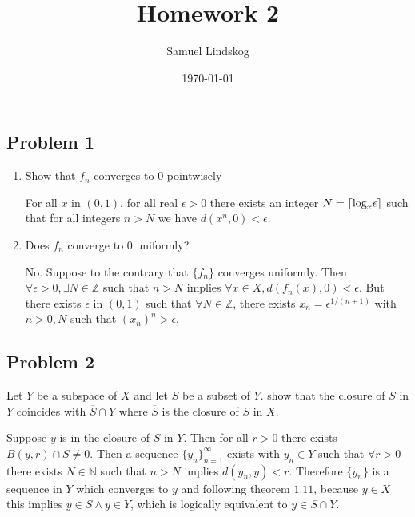 \documentclass{article}
\title{Homework 2}
\author{Samuel Lindskog}
\date\today
\DeclarePairedDelimiter{\ceil}{\lceil}{\rceil}
\begin{document}
\maketitle %

\subsection*{Problem 1}
\begin{enumerate}
	\item Show that \(f_n\) converges to \(0\) pointwisely
		\begin{IEEEproof}
			For all \(x\) in \((0,1)\), for all real \(\epsilon>0\) there exists an integer \(N=\ceil{\text{log}_x\epsilon}\) such that for all integers \(n>N\) we have \(d(x^n,0)<\epsilon\).
		\end{IEEEproof}
	\item Does \(f_n\) converge to \(0\) uniformly?
		\begin{IEEEproof}
			No. Suppose to the contrary that \(\{f_n\}\) converges uniformly. Then \(\forall\epsilon>0,\exists N\in\mathbb{Z}\) such that \(n>N\) implies \(\forall x\in X,d(f_n(x),0)<\epsilon\). But there exists \(\epsilon\) in \((0,1)\) such that \(\forall N\in\mathbb{Z}\), there exists \(x_n=\epsilon^{1/(n+1)}\) with \(n>0, N\) such that \((x_n)^n>\epsilon\).
		\end{IEEEproof}
\end{enumerate}
\subsection*{Problem 2}
Let \(Y\) be a subspace of \(X\) and let \(S\) be a subset of \(Y\). show that the closure of \(S\) in \(Y\) coincides with \(\overline{S}\cap Y\) where \(\overline{S}\) is the closure of \(S\) in \(X\).
\begin{IEEEproof}
	Suppose \(y\) is in the closure of \(S\) in \(Y\). Then for all \(r>0\) there exists \(B(y,r)\cap S\neq 0\). Then a sequence \(\{y_n\}_{n=1}^{\infty}\) exists with \(y_n\in Y\) such that \(\forall r>0\) there exists \(N\in\mathbb{N}\) such that \(n>N\) implies \(d(y_n,y)<r\). Therefore \(\{y_n\}\) is a sequence in \(Y\) which converges to \(y\) and following theorem \(1.11\), because \(y\in X\) this implies \(y\in\overline{S}\wedge y\in Y\), which is logically equivalent to \(y\in\overline{S}\cap Y\).
\end{IEEEproof}
\end{document}
